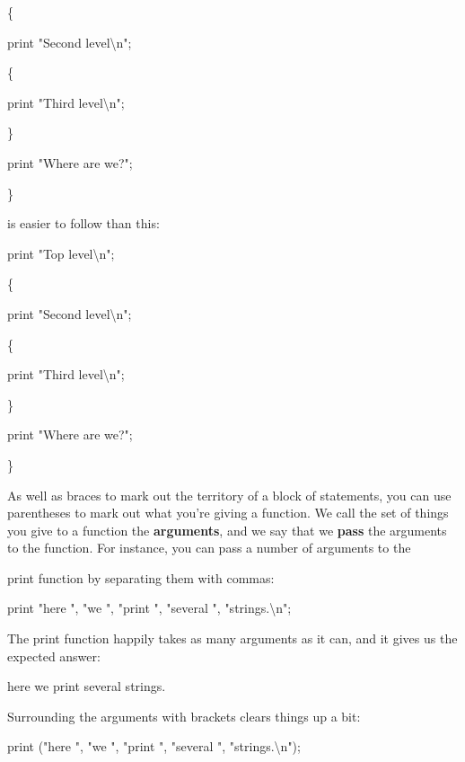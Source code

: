\documentclass[a4paper,11pt]{book}
\begin{document}
\noindent \{

\noindent print "Second level\textbackslash n";

\noindent \{

\noindent print "Third level\textbackslash n";

\noindent \}

\noindent print "Where are we?";

\noindent \}

\noindent 

\noindent is easier to follow than this:

\noindent 

\noindent 

\noindent print "Top level\textbackslash n";

\noindent \{

\noindent print "Second level\textbackslash n";

\noindent \{

\noindent print "Third level\textbackslash n";

\noindent \}

\noindent print "Where are we?";

\noindent \}

\noindent 

\noindent As well as braces to mark out the territory of a block of statements, you can use parentheses to mark out what you're giving a function. We call the set of things you give to a function the \textbf{arguments}, and we say that we \textbf{pass }the arguments to the function. For instance, you can pass a number of arguments to the

\noindent print function by separating them with commas:

\noindent 

\noindent 

\noindent print "here ", "we ", "print ", "several ", "strings.\textbackslash n";

\noindent 

\noindent The print function happily takes as many arguments as it can, and it gives us the expected answer:

\noindent 

\noindent here we print several strings.

\noindent 

\noindent Surrounding the arguments with brackets clears things up a bit:

\noindent 

\noindent print ("here ", "we ", "print ", "several ", "strings.\textbackslash n");
\end{document}
